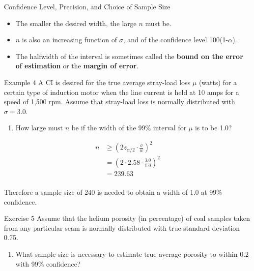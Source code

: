 \documentclass[
  ignorenonframetext,
]{beamer}
\providecommand{\tightlist}{%
  \setlength{\itemsep}{0pt}\setlength{\parskip}{0pt}}\usepackage{longtable,booktabs,array}
\begin{document}
\begin{frame}{Confidence Level, Precision, and Choice of Sample Size}
\protect\hypertarget{confidence-level-precision-and-choice-of-sample-size-2}{}
\begin{itemize}[<+->]
\tightlist
\item
  The smaller the desired width, the large \(n\) must be.
\item
  \(n\) is also an increasing function of \(\sigma\), and of the
  confidence level 100(1-\(\alpha\)).
\item
  The halfwidth of the interval is sometimes called the \textbf{bound on
  the error of estimation} or the \textbf{margin of error}.
\end{itemize}
\end{frame}

\begin{frame}{Example 4}
\protect\hypertarget{example-4}{}
A CI is desired for the true average stray-load loss \(\mu\) (watts) for
a certain type of induction motor when the line current is held at 10
amps for a speed of 1,500 rpm. Assume that stray-load loss is normally
distributed with \(\sigma = 3.0\).

\begin{enumerate}[<+->]
[a.]
\setcounter{enumi}{4}
\tightlist
\item
  How large must \(n\) be if the width of the 99\% interval for \(\mu\)
  is to be 1.0?
\end{enumerate}

\[
\begin{aligned}
n &\geq \left(2z_{\alpha/2}\cdot \frac{\sigma}{w} \right)^{2} \\
&= \left(2\cdot 2.58\cdot \frac{3.0}{1.0} \right)^{2} \\
&= 239.63 \\
\end{aligned} 
\]

Therefore a sample size of 240 is needed to obtain a width of 1.0 at
99\% confidence.
\end{frame}

\begin{frame}{Exercise 5}
\protect\hypertarget{exercise-5}{}
Assume that the helium porosity (in percentage) of coal samples taken
from any particular seam is normally distributed with true standard
deviation 0.75.

\begin{enumerate}[<+->]
[a.]
\setcounter{enumi}{4}
\tightlist
\item
  What sample size is necessary to estimate true average porosity to
  within 0.2 with 99\% confidence?
\end{enumerate}
\end{frame}
\end{document}
